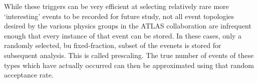 While these triggers can be very efficient at selecting relatively rare more `interesting' events to be recorded for future study, not all event topologies desired by the various physics groups in the ATLAS collaboration are infrequent enough that every instance of that event can be stored.  
In these cases, only a randomly selected, bu fixed-fraction, subset of the evenets is stored for subsequent analysis.  
This is called prescaling.  
The true number of events of these types which have actually occurred can then be approximated using that random acceptance rate.  
 
 
 





